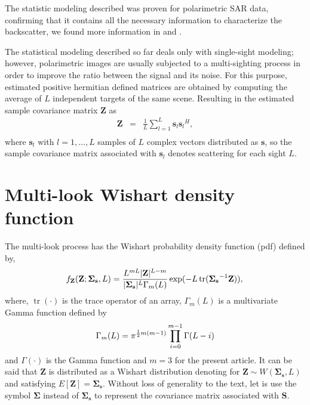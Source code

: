 \documentclass[conference]{IEEEtran}
\DeclareMathOperator{\traco}{tr}
\begin{document}
{{{{The statistic modeling described was proven for polarimetric SAR data, confirming that it contains all the necessary information to characterize the backscatter, we found more information in \cite{sarabendi} and \cite{mfp}.
 
The statistical modeling described so far deals only with single-sight modeling; however, polarimetric images are usually subjected to a multi-sighting process in order to improve the ratio between the signal and its noise. For this purpose, estimated positive hermitian defined matrices are obtained by computing the average of $L$ independent targets of the same scene. Resulting in the estimated sample covariance matrix {\bf Z} as \cite{good, ade}
\begin{equation}\label{eq_04}
\begin{array}{ccc}
    \mathbf{Z}&=&\frac{1}{L}\displaystyle{\sum_{l=1}^{L} {\mathbf{s}_l}{\mathbf{s}_l}^H}, \\
\end{array}
\end{equation}
where $\mathbf{s}_l$ with $l = 1, \dots, L$ samples of $\mathit{L}$ complex vectors distributed as $\mathbf{s}$, so the sample covariance matrix associated with $\mathbf{s}_l$ denotes scattering for each sight $L$.

\section{Multi-look Wishart density function}\label{sec_03}
The multi-look process has the Wishart probability density function (pdf) defined by,
\begin{equation}\label{eq_05}
    f_{\mathbf{Z}}(\mathbf{Z};\mathbf{\Sigma_{s}},L)=\frac{L^{mL}|\mathbf{Z}|^{L-m}}{|\mathbf{\Sigma_{s}}|^{L}\Gamma_m(L)} \exp(-L\traco(\mathbf{\Sigma_{s}}^{-1}\mathbf{Z})), \\
\end{equation} 
where, $\traco(\cdot)$ is the trace operator of an array, $\Gamma_m(L)$ is a multivariate Gamma function defined by
\begin{equation*}
	\Gamma_m(L)=\pi^{\frac{1}{2}m(m-1)} \prod_{i=0}^{m-1}\Gamma(L-i) \\
\end{equation*}
and $\Gamma(\cdot)$ is the Gamma function and $m=3$ for the present article. It can be said that $\mathbf{Z}$ is distributed as a Wishart distribution denoting for $\mathbf{Z}\sim W(\mathbf{\Sigma_{s}}, L)$ and satisfying $E[\mathbf{Z}]=\mathbf{\Sigma_{s}}$. Without loss of generality to the text, let is use the symbol $\mathbf{\Sigma}$ instead of $\mathbf{\Sigma_{s}}$ to represent the covariance matrix associated with $\mathbf{S}$.

}}}}
\end{document}
